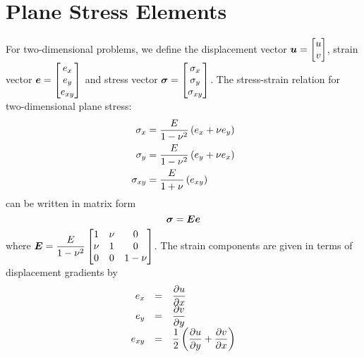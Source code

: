 
\section{Plane Stress Elements}
\vspace{-5mm}
For two-dimensional problems, we define the displacement vector 
$ \boldsymbol{u}  = \begin{bmatrix} 
  u \\ 
  v 
\end{bmatrix}$, strain vector $ \boldsymbol{e}  = \begin{bmatrix}
  e_{x} \\
  e_{y} \\ 
  e_{xy}
\end{bmatrix}$ and stress vector $ \boldsymbol{\sigma}  = \begin{bmatrix}
  \sigma_{x} \\
  \sigma_{y} \\
  \sigma_{xy} 
\end{bmatrix}$. The stress-strain relation for two-dimensional plane stress:
\begin{gather}
  \begin{aligned}
    \sigma_{x} &= \dfrac{E}{1-\nu^{2}}\left( e_{x}+\nu e_{y} \right) \\
    \sigma_{y} &= \dfrac{E}{1-\nu^{2}}\left( e_{y}+\nu e_{x} \right) \\
    \sigma_{xy} &= \dfrac{E}{1+\nu}\left( e_{xy} \right)
  \end{aligned}
  \label{eqn:planestress}
\end{gather}
can be written in matrix form
\begin{displaymath}
  \vectr{\sigma}=\matr{E}\vectr{e}
\end{displaymath}
where $\matr{E} = \dfrac{E}{1-\nu^{2}} \begin{bmatrix}
  1 & \nu & 0\\
  \nu & 1 & 0\\
  0 & 0 & 1-\nu
\end{bmatrix}$. 
The strain components are given in terms of displacement gradients by
\begin{equation}
  \begin{array}{rcl}
    e_{x} & = &  \dfrac{\partial u}{\partial x}  \\
    e_{y} & = &  \dfrac{\partial v}{\partial y}  \\
    e_{xy} & = & \dfrac{1}{2} \left(  \dfrac{\partial u}{\partial y}  +  \dfrac{\partial v}{\partial x}  \right)
  \end{array}
  \label{eqn:stcom}
\end{equation}

